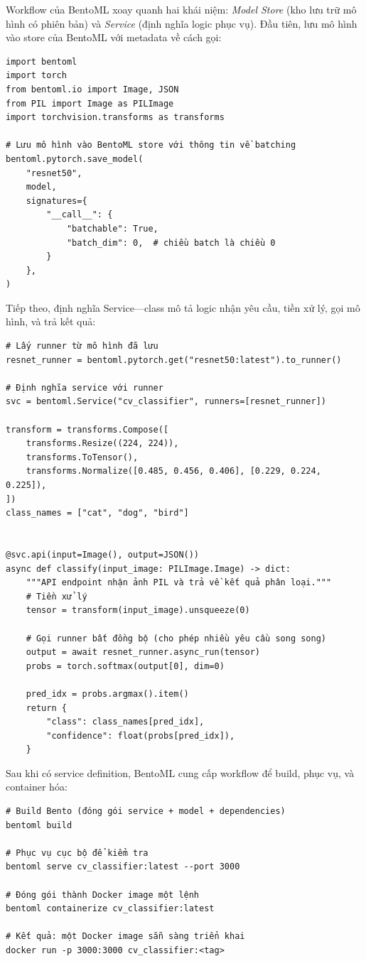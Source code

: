 Workflow của BentoML xoay quanh hai khái niệm: \textit{Model Store} (kho lưu trữ mô hình có phiên bản) và \textit{Service} (định nghĩa logic phục vụ). Đầu tiên, lưu mô hình vào store của BentoML với metadata về cách gọi:

\begin{verbatim}
import bentoml
import torch
from bentoml.io import Image, JSON
from PIL import Image as PILImage
import torchvision.transforms as transforms

# Lưu mô hình vào BentoML store với thông tin về batching
bentoml.pytorch.save_model(
    "resnet50",
    model,
    signatures={
        "__call__": {
            "batchable": True,
            "batch_dim": 0,  # chiều batch là chiều 0
        }
    },
)
\end{verbatim}

Tiếp theo, định nghĩa Service---class mô tả logic nhận yêu cầu, tiền xử lý, gọi mô hình, và trả kết quả:

\begin{verbatim}
# Lấy runner từ mô hình đã lưu
resnet_runner = bentoml.pytorch.get("resnet50:latest").to_runner()

# Định nghĩa service với runner
svc = bentoml.Service("cv_classifier", runners=[resnet_runner])

transform = transforms.Compose([
    transforms.Resize((224, 224)),
    transforms.ToTensor(),
    transforms.Normalize([0.485, 0.456, 0.406], [0.229, 0.224, 0.225]),
])
class_names = ["cat", "dog", "bird"]


@svc.api(input=Image(), output=JSON())
async def classify(input_image: PILImage.Image) -> dict:
    """API endpoint nhận ảnh PIL và trả về kết quả phân loại."""
    # Tiền xử lý
    tensor = transform(input_image).unsqueeze(0)

    # Gọi runner bất đồng bộ (cho phép nhiều yêu cầu song song)
    output = await resnet_runner.async_run(tensor)
    probs = torch.softmax(output[0], dim=0)

    pred_idx = probs.argmax().item()
    return {
        "class": class_names[pred_idx],
        "confidence": float(probs[pred_idx]),
    }
\end{verbatim}

Sau khi có service definition, BentoML cung cấp workflow để build, phục vụ, và container hóa:

\begin{verbatim}
# Build Bento (đóng gói service + model + dependencies)
bentoml build

# Phục vụ cục bộ để kiểm tra
bentoml serve cv_classifier:latest --port 3000

# Đóng gói thành Docker image một lệnh
bentoml containerize cv_classifier:latest

# Kết quả: một Docker image sẵn sàng triển khai
docker run -p 3000:3000 cv_classifier:<tag>
\end{verbatim}

